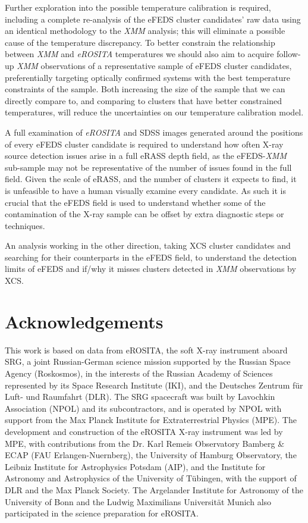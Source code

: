\documentclass[fleqn,usenatbib]{mnras}
\begin{document}
Further exploration into the possible temperature calibration is required, including a complete re-analysis of the eFEDS cluster candidates' raw data using an identical methodology to the {\em XMM} analysis; this will eliminate a possible cause of the temperature discrepancy. To better constrain the relationship between {\em XMM} and {\em eROSITA} temperatures we should also aim to acquire follow-up {\em XMM} observations of a representative sample of eFEDS cluster candidates, preferentially targeting optically confirmed systems with the best temperature constraints of the sample. Both increasing the size of the sample that we can directly compare to, and comparing to clusters that have better constrained temperatures, will reduce the uncertainties on our temperature calibration model.

A full examination of {\em eROSITA} and SDSS images generated around the positions of every eFEDS cluster candidate is required to understand how often X-ray source detection issues arise in a full eRASS depth field, as the eFEDS-{\em XMM} sub-sample may not be representative of the number of issues found in the full field. Given the scale of eRASS, and the number of clusters it expects to find, it is unfeasible to have a human visually examine every candidate. As such it is crucial that the eFEDS field is used to understand whether some of the contamination of the X-ray sample can be offset by extra diagnostic steps or techniques.

An analysis working in the other direction, taking XCS cluster candidates and searching for their counterparts in the eFEDS field, to understand the detection limits of eFEDS and if/why it misses clusters detected in {\em XMM} observations by XCS.

\section*{Acknowledgements}
This work is based on data from eROSITA, the soft X-ray instrument aboard SRG, a joint Russian-German science mission supported by the Russian Space Agency (Roskosmos), in the interests of the Russian Academy of Sciences represented by its Space Research Institute (IKI), and the Deutsches Zentrum für Luft- und Raumfahrt (DLR). The SRG spacecraft was built by Lavochkin Association (NPOL) and its subcontractors, and is operated by NPOL with support from the Max Planck Institute for Extraterrestrial Physics (MPE). The development and construction of the eROSITA X-ray instrument was led by MPE, with contributions from the Dr. Karl Remeis Observatory Bamberg & ECAP (FAU Erlangen-Nuernberg), the University of Hamburg Observatory, the Leibniz Institute for Astrophysics Potsdam (AIP), and the Institute for Astronomy and Astrophysics of the University of Tübingen, with the support of DLR and the Max Planck Society. The Argelander Institute for Astronomy of the University of Bonn and the Ludwig Maximilians Universität Munich also participated in the science preparation for eROSITA.
\end{document}
